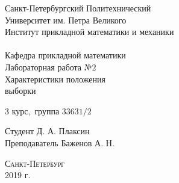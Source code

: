 \documentclass[a4]{article}
\begin{document}
\def\contentsname{\LARGE{Содержание}}
\thispagestyle{empty}
\begin{center} 
\vspace{2cm} 
{\Large \sc Санкт-Петербургский Политехнический}\\
\vspace{2mm}
{\Large \sc Университет} им. {\Large\sc Петра Великого}\\
\vspace{1cm}
{\large \sc Институт прикладной математики и механики\\ 
\vspace{0.5mm}
\textsc{}}\\ 
\vspace{0.5mm}
{\large\sc Кафедра прикладной математики}\\
\vspace{15mm}
{\huge \sc Лабораторная работа №$2$\\
\vspace{0.1cm}
Характеристики положения\\
\vspace{0.5cm}
выборки
\vspace{6mm}
 }
\vspace*{2mm}
\vspace{1cm}

{\sc $3$ курс$,$ группа $33631/2$}

\vspace{2cm} 
Студент \hfill Д. А. Плаксин\\
\vspace{1cm}
Преподаватель \hfill Баженов А. Н.\\
\vspace{20mm} 

\end{center} 
\begin{center}
\vfill {\large\textsc{Санкт-Петербург}}\\ 
2019 г.
\end{center}

\end{document}

